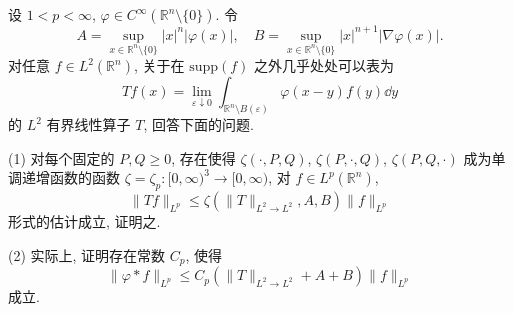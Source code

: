 \begin{exercise}\label{exer:4.13}
设 $1 < p < \infty$, $\varphi \in C^{\infty}(\mathbb{R}^{n}\setminus\{0\})$. 令
\[
A = \sup_{x \in \mathbb{R}^{n}\setminus\{0\}}|x|^{n}|\varphi(x)|, \quad B = \sup_{x \in \mathbb{R}^{n}\setminus\{0\}}|x|^{n+1}|\nabla\varphi(x)|.
\]
对任意 $f \in L^{2}(\mathbb{R}^{n})$, 关于在 $\mathrm{supp}(f)$ 之外几乎处处可以表为
\[
Tf(x) = \lim_{\varepsilon \downarrow 0}\int_{\mathbb{R}^{n}\setminus B(\varepsilon)}\varphi(x-y)f(y)\dd y
\]
的 $L^{2}$ 有界线性算子 $T$, 回答下面的问题.

(1) 对每个固定的 $P, Q \geq 0$, 存在使得 $\zeta(\cdot, P, Q)$, $\zeta(P, \cdot, Q)$, $\zeta(P, Q, \cdot)$ 成为单调递增函数的函数 $\zeta = \zeta_{p}: [0, \infty)^{3} \to [0, \infty)$, 对 $f \in L^{p}(\mathbb{R}^{n})$,
\[
\|Tf\|_{L^{p}} \leq \zeta(\|T\|_{L^{2} \to L^{2}}, A, B)\|f\|_{L^{p}}
\]
形式的估计成立, 证明之.

(2) 实际上, 证明存在常数 $C_{p}$, 使得
\[
\|\varphi * f\|_{L^{p}} \leq C_{p}(\|T\|_{L^{2} \to L^{2}} + A + B)\|f\|_{L^{p}}
\]
成立.
\end{exercise}
